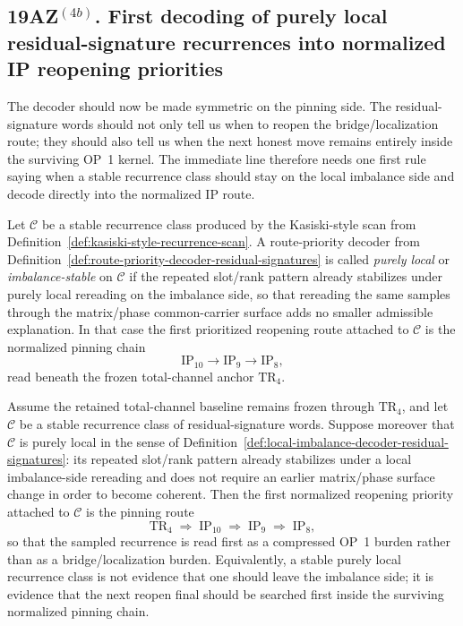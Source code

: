 \subsection*{19AZ$^{(4b)}$. First decoding of purely local residual-signature recurrences into normalized IP reopening priorities}
\label{sec:first-decoding-of-local-signature-recurrences-into-ip-priorities}
The decoder should now be made symmetric on the pinning side. The residual-signature words should not only tell us when to reopen the bridge/localization route; they should also tell us when the next honest move remains entirely inside the surviving OP~1 kernel. The immediate line therefore needs one first rule saying when a stable recurrence class should stay on the local imbalance side and decode directly into the normalized IP route.

\begin{definition}
\label{def:local-imbalance-decoder-residual-signatures}
Let \(\mathcal C\) be a stable recurrence class produced by the Kasiski-style scan from Definition~\ref{def:kasiski-style-recurrence-scan}. A route-priority decoder from Definition~\ref{def:route-priority-decoder-residual-signatures} is called \emph{purely local} or \emph{imbalance-stable} on \(\mathcal C\) if the repeated slot/rank pattern already stabilizes under purely local rereading on the imbalance side, so that rereading the same samples through the matrix/phase common-carrier surface adds no smaller admissible explanation. In that case the first prioritized reopening route attached to \(\mathcal C\) is the normalized pinning chain
\[
\mathrm{IP}_{10} \to \mathrm{IP}_9 \to \mathrm{IP}_8,
\]
read beneath the frozen total-channel anchor \(\mathrm{TR}_4\).
\end{definition}

\begin{proposition}
\label{prop:purely-local-signature-classes-prioritize-ip-route}
Assume the retained total-channel baseline remains frozen through \(\mathrm{TR}_4\), and let \(\mathcal C\) be a stable recurrence class of residual-signature words. Suppose moreover that \(\mathcal C\) is purely local in the sense of Definition~\ref{def:local-imbalance-decoder-residual-signatures}: its repeated slot/rank pattern already stabilizes under a local imbalance-side rereading and does not require an earlier matrix/phase surface change in order to become coherent. Then the first normalized reopening priority attached to \(\mathcal C\) is the pinning route
\[
\mathrm{TR}_4 \;\Longrightarrow\; \mathrm{IP}_{10} \;\Longrightarrow\; \mathrm{IP}_9 \;\Longrightarrow\; \mathrm{IP}_8,
\]
so that the sampled recurrence is read first as a compressed OP~1 burden rather than as a bridge/localization burden.
Equivalently, a stable purely local recurrence class is not evidence that one should leave the imbalance side; it is evidence that the next reopen final should be searched first inside the surviving normalized pinning chain.
\end{proposition}

